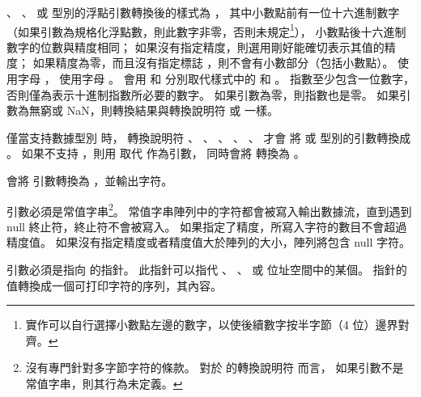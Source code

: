 {{
、 、 
 或  型別的浮點引數轉換後的樣式為 ，
其中小數點前有一位十六進制數字（如果引數為規格化浮點數，則此數字非零，否則未規定\footnote{
實作可以自行選擇小數點左邊的數字，以使後續數字按半字節（4 位）邊界對齊。}），
小數點後十六進制數字的位數與精度相同；
如果沒有指定精度，則選用剛好能確切表示其值的精度；
如果精度為零，而且沒有指定標誌 \cemp{#}，則不會有小數部分（包括小數點）。
  使用字母 ，  使用字母 。
  會用  和  分別取代樣式中的  和 。
指數至少包含一位數字，否則僅為表示十進制指數所必要的數字。
如果引數為零，則指數也是零。
如果引數為無窮或 NaN，則轉換結果與轉換說明符  或  一樣。
\stopclSpecifier

\startnotepar
僅當支持數據型別  時，
轉換說明符 、 、 、 、 、  才會
將  或  型別的引數轉換成 。
如果不支持 ，則用  取代  作為引數，
同時會將  轉換為 。
\stopnotepar

會將  引數轉換為 ，並輸出字符。
\stopclSpecifier

引數必須是常值字串\footnote{
沒有專門針對多字節字符的條款。
對於  的轉換說明符  而言，
如果引數不是常值字串，則其行為未定義。}。
常值字串陣列中的字符都會被寫入輸出數據流，直到遇到 null 終止符，終止符不會被寫入。
如果指定了精度，所寫入字符的數目不會超過精度值。
如果沒有指定精度或者精度值大於陣列的大小，陣列將包含 null 字符\problem{}。
\stopclSpecifier

引數必須是指向  的指針。
此指針可以指代 、 、  或 
 位址空間中的某個。
指針的值轉換成一個可打印字符的序列，其內容。
\stopclSpecifier

\startbuffer
\cemp{%
\stopbuffer
\startclSpecifier{\getbuffer}
直接輸出 \cemp{%
完整的轉換規約為 \cemp{%
\stopclSpecifier

如果轉換規約無效，其行為未定義。
如果任一轉換規約的對應引數型別不正確，其行為也是未定義的。

任何情況下，欄寬較小和欄位不存在都不會引起欄位的截斷；
如果轉換結果比欄寬寬，則會對此欄位進行擴充，以包含整個轉換結果。

}}}}}
